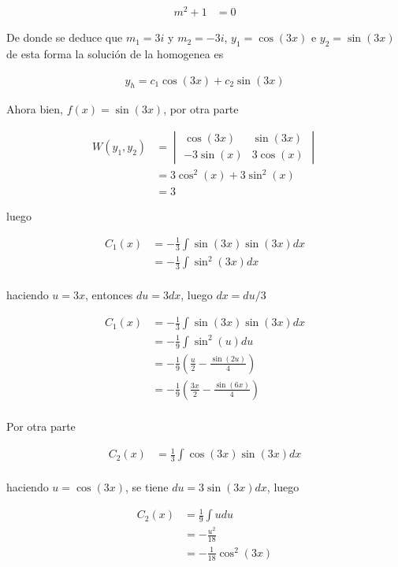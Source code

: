 \documentclass{article}
\theoremstyle{plain}
\theoremstyle{definition}
\begin{document}
\begin{align*}
    m^2+1 &= 0
\end{align*}

De donde se deduce que $m_1=3i$ y $m_2=-3i$, $y_1=\cos(3x)$ e $y_2=\sin(3x)$ de esta forma la solución de la homogenea es

\begin{align*}
    y_h= c_1\cos(3x)+c_2\sin(3x)
\end{align*}

Ahora bien, $f(x)=\sin(3x)$, por otra parte


\begin{align*}
    W(y_1,y_2) &= \begin{vmatrix}
\cos(3x) & \sin(3x) \\
-3\sin(x) & 3\cos(x)
\end{vmatrix} \\
&= 3\cos^2(x)+3\sin^2(x) \\
&= 3
\end{align*}

luego

\begin{align*}
    C_1(x) &= -\frac{1}{3}\int \sin(3x)\sin(3x) dx\\
    &= -\frac{1}{3}\int \sin^2(3x) dx\\
\end{align*}

haciendo $u=3x$, entonces $du=3dx$, luego $dx=du/3$

\begin{align*}
    C_1(x) &= -\frac{1}{3}\int \sin(3x)\sin(3x) dx\\
    &= -\frac{1}{9}\int \sin^2(u) du\\
    &= -\frac{1}{9}\left( \frac{u}{2}-\frac{\sin(2u)}{4} \right) \\
    &= -\frac{1}{9}\left( \frac{3x}{2}-\frac{\sin(6x)}{4} \right) \\
\end{align*}

Por otra parte

\begin{align*}
    C_2(x) &= \frac{1}{3}\int \cos(3x)\sin(3x) dx\\
\end{align*}

haciendo $u=\cos(3x)$, se tiene $du=3\sin(3x)dx$, luego

\begin{align*}
    C_2(x) &= \frac{1}{9}\int u du\\
    &= -\frac{u^2}{18}\\
    &= -\frac{1}{18}\cos^2(3x)\\
\end{align*}
\end{document}
